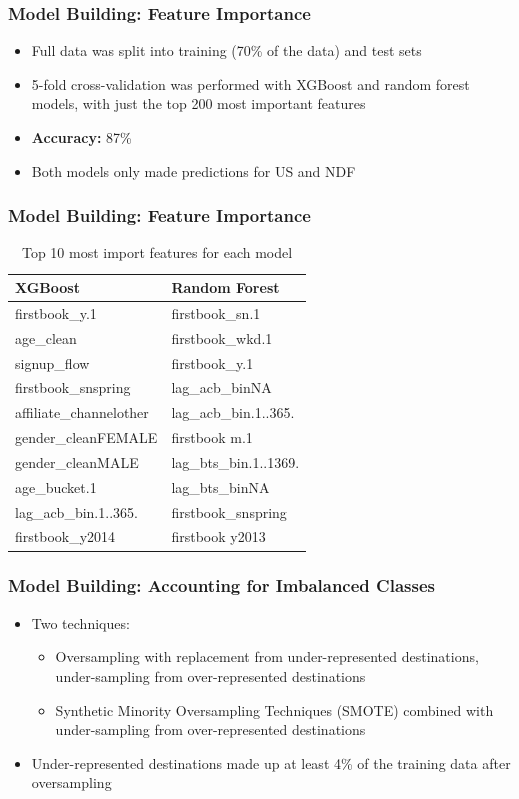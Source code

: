 \documentclass{beamer}
\begin{document}
\begin{frame}
\frametitle{Model Building: Feature Importance}
\begin{itemize}
  \item Full data was split into training (70\% of the data) and test sets
  \item 5-fold cross-validation was performed with XGBoost and random forest models, with just the top 200 most important features
  \item \textbf{Accuracy:} 87\%
  \item Both models only made predictions for US and NDF
\end{itemize}
\end{frame}

\begin{frame}
\frametitle{Model Building: Feature Importance}

\begin{table}[ht]
\centering
\begin{tabular}{| l | l |}
  \hline
  \textbf{XGBoost} & \textbf{Random Forest} \\ 
  \hline
  firstbook\_y.1 & firstbook\_sn.1 \\
  age\_clean & firstbook\_wkd.1 \\
  signup\_flow & firstbook\_y.1 \\
  firstbook\_snspring & lag\_acb\_binNA \\
  affiliate\_channelother & lag\_acb\_bin.1..365. \\
  gender\_cleanFEMALE & firstbook m.1 \\
  gender\_cleanMALE & lag\_bts\_bin.1..1369. \\
  age\_bucket.1 & lag\_bts\_binNA \\
  lag\_acb\_bin.1..365. & firstbook\_snspring \\
  firstbook\_y2014 & firstbook y2013 \\
  \hline
\end{tabular}
\caption{Top 10 most import features for each model}
\end{table}

\end{frame}

\begin{frame}
\frametitle{Model Building: Accounting for Imbalanced Classes}
\begin{itemize}
  \item Two techniques:
  \begin{itemize}
    \item Oversampling with replacement from under-represented destinations, under-sampling from over-represented destinations
    \item Synthetic Minority Oversampling Techniques (SMOTE) combined with under-sampling from over-represented destinations 
  \end{itemize}
  \item Under-represented destinations made up at least 4\% of the training data after oversampling
\end{itemize}
\end{frame}
\end{document}
